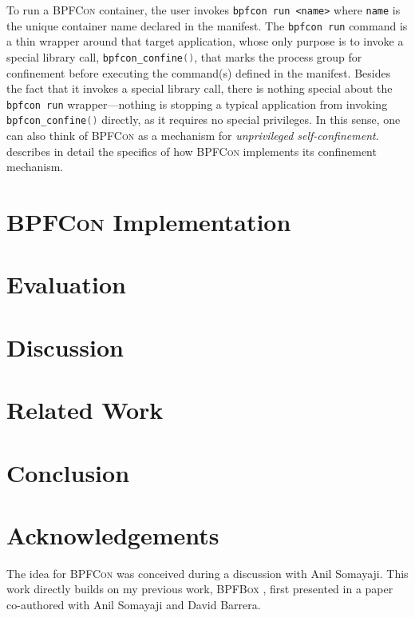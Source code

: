 \documentclass[dvipsnames, 12pt]{article}
\def\bpfcon{\textsc{BPFCon}}
\begin{document}
To run a \bpfcon{} container, the user invokes \texttt{bpfcon run <name>} where
\texttt{name} is the unique container name declared in the manifest.  The
\texttt{bpfcon run} command is a thin wrapper around that target application,
whose only purpose is to invoke a special library call,
\lstinline[language=c]|bpfcon_confine()|, that marks the process group for
confinement before executing the command(s) defined in the manifest. Besides the
fact that it invokes a special library call, there is nothing special about the
\texttt{bpfcon run} wrapper---nothing is stopping a typical application from
invoking \lstinline[language=c]|bpfcon_confine()| directly, as it requires no
special privileges. In this sense, one can also think of \bpfcon{} as
a mechanism for \textit{unprivileged self-confinement}.
 describes in detail the specifics of how
\bpfcon{} implements its confinement mechanism.

\section{\bpfcon{} Implementation}
\label{sec:implementation}

\section{Evaluation}

\section{Discussion}

\section{Related Work}

\section{Conclusion}

\section{Acknowledgements}

The idea for \bpfcon{} was conceived during a discussion with Anil Somayaji.
This work directly builds on my previous work, \textsc{BPFBox}
\cite{findlay20_bpfbox}, first presented in a paper co-authored with Anil
Somayaji and David Barrera.

\clearpage
\printbibliography
\end{document}
